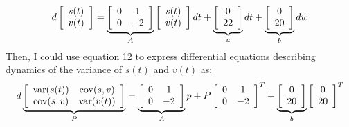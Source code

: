 \documentclass{article}
\begin{document}
\begin{equation}
	d\left[ {\begin{array}{*{20}c}
	   {s(t)}  \\
	   {v(t)}  \\
	\end{array}} \right] = \underbrace {\left[ {\begin{array}{*{20}c}
	   0 & 1  \\
	   0 & { - 2}  \\
	\end{array}} \right]}_A\left[ {\begin{array}{*{20}c}
	   {s(t)}  \\
	   {v(t)}  \\
	\end{array}} \right]dt + \underbrace {\left[ {\begin{array}{*{20}c}
	   0  \\
	   {22}  \\
	\end{array}} \right]}_udt + \underbrace {\left[ {\begin{array}{*{20}c}
	   0  \\
	   {20}  \\
	\end{array}} \right]}_bdw
\end{equation}
Then, I could use equation 12 to express differential equations describing dynamics of the variance 
of $s(t)$ and $v(t)$ as:
\begin{equation}
	d\underbrace {\left[ {\begin{array}{*{20}c}
	   {{\mathop{\rm var}} (s(t))} & {{\mathop{\rm cov}} (s,v)}  \\
	   {{\mathop{\rm cov}} (s,v)} & {{\mathop{\rm var}} (v(t))}  \\
	\end{array}} \right]}_P = \underbrace {\left[ {\begin{array}{*{20}c}
	   0 & 1  \\
	   0 & { - 2}  \\
	\end{array}} \right]}_Ap + P\left[ {\begin{array}{*{20}c}
	   0 & 1  \\
	   0 & { - 2}  \\
	\end{array}} \right]^T  + \underbrace {\left[ {\begin{array}{*{20}c}
	   0  \\
	   {20}  \\
	\end{array}} \right]}_b\left[ {\begin{array}{*{20}c}
	   0  \\
	   {20}  \\
	\end{array}} \right]^T 
\end{equation}
\end{document}
